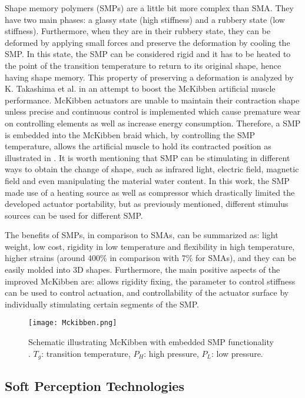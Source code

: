 Shape memory polymers (SMPs) are a little bit more complex than SMA. They have two main phases: a glassy state (high stiffness) and a rubbery state (low stiffness). Furthermore, when they are in their rubbery state, they can be deformed by applying small forces and preserve the deformation by cooling the SMP. In this state, the SMP can be considered rigid and it has to be heated to the point of the transition temperature to return to its original shape, hence having shape memory. This property of preserving a deformation is analyzed by K. Takashima et al. \cite{Takashima2010} in an attempt to boost the McKibben artificial muscle performance. McKibben actuators are unable to maintain their contraction shape unless precise and continuous control is implemented which cause premature wear on controlling elements as well as increase energy consumption. Therefore, a SMP is embedded into the McKibben braid which, by controlling the SMP temperature, allows the artificial muscle to hold its contracted position as illustrated in . It is worth mentioning that SMP can be stimulating in different ways to obtain the change of shape, such as infrared light, electric field, magnetic field and even manipulating the material water content. In this work, the SMP made use of a heating source as well as compressor which drastically limited the developed actuator portability, but as previously mentioned, different stimulus sources can be used for different SMP.

The benefits of SMPs, in comparison to SMAs, can be summarized as: light weight, low cost, rigidity in low temperature and flexibility in high temperature, higher strains (around 400\% in comparison with 7\% for SMAs), and they can be easily molded into 3D shapes. Furthermore, the main positive aspects of the improved McKibben are: allows rigidity fixing, the parameter to control stiffness can be used to control actuation, and controllability of the actuator surface by individually stimulating certain segments of the SMP.

\begin{figure}[hbtp!]
    \centering
    \texttt{[image: Mckibben.png]}
    \caption{Schematic illustrating McKibben with embedded SMP functionality \cite{Takashima2010}. $T_g$: transition temperature, $P_H$: high pressure, $P_L$: low pressure. }
    \label{fig:mckibben}
\end{figure}

\subsection{Soft Perception Technologies}


